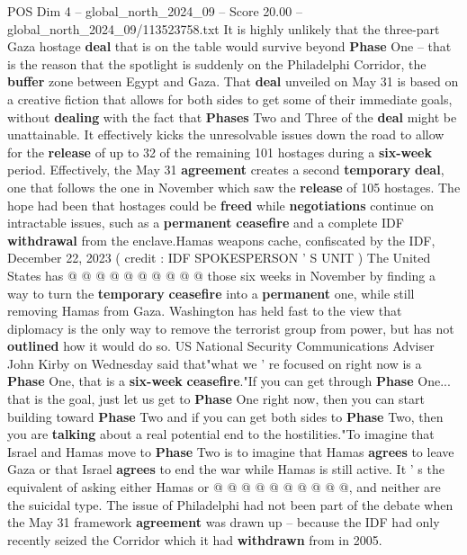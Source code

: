 \begin{textsample}{POS Dim 4 – global\_north\_2024\_09 – Score 20.00 – global\_north\_2024\_09/113523758.txt}  \label{ex:f4_pos_326}
It is highly unlikely that the three-part Gaza hostage \textbf{deal} that is on the table would survive beyond \textbf{Phase} One -- that is the reason that the spotlight is suddenly on the Philadelphi Corridor, the \textbf{buffer} zone between Egypt and Gaza.
That \textbf{deal} unveiled on May 31 is based on a creative fiction that allows for both sides to get some of their immediate goals, without \textbf{dealing} with the fact that \textbf{Phases} Two and Three of the \textbf{deal} might be unattainable.
It effectively kicks the unresolvable issues down the road to allow for the \textbf{release} of up to 32 of the remaining 101 hostages during a \textbf{six-week} period.
Effectively, the May 31 \textbf{agreement} creates a second \textbf{temporary} \textbf{deal}, one that follows the one in November which saw the \textbf{release} of 105 hostages.
The hope had been that hostages could be \textbf{freed} while \textbf{negotiations} continue on intractable issues, such as a \textbf{permanent} \textbf{ceasefire} and a complete IDF \textbf{withdrawal} from the enclave.Hamas weapons cache, confiscated by the IDF, December 22, 2023 ( credit : IDF SPOKESPERSON ' S UNIT ) The United States has @ @ @ @ @ @ @ @ @ @ those six weeks in November by finding a way to turn the \textbf{temporary} \textbf{ceasefire} into a \textbf{permanent} one, while still removing Hamas from Gaza.
Washington has held fast to the view that diplomacy is the only way to remove the terrorist group from power, but has not \textbf{outlined} how it would do so.
US National Security Communications Adviser John Kirby on Wednesday said that"what we ' re focused on right now is a \textbf{Phase} One, that is a \textbf{six-week} \textbf{ceasefire}."If you can get through \textbf{Phase} One... that is the goal, just let us get to \textbf{Phase} One right now, then you can start building toward \textbf{Phase} Two and if you can get both sides to \textbf{Phase} Two, then you are \textbf{talking} about a real potential end to the hostilities."To imagine that Israel and Hamas move to \textbf{Phase} Two is to imagine that Hamas \textbf{agrees} to leave Gaza or that Israel \textbf{agrees} to end the war while Hamas is still active.
It ' s the equivalent of asking either Hamas or @ @ @ @ @ @ @ @ @ @, and neither are the suicidal type.
The issue of Philadelphi had not been part of the debate when the May 31 framework \textbf{agreement} was drawn up -- because the IDF had only recently seized the Corridor which it had \textbf{withdrawn} from in 2005.

\end{textsample}
